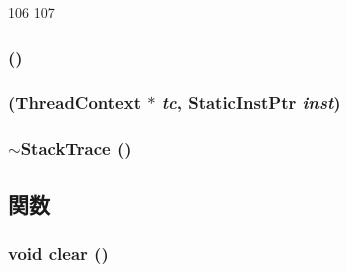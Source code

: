 \begin{DoxyCode}
106 {
107 }
\end{DoxyCode}
\hypertarget{classMipsISA_1_1StackTrace_a5a9b2e3bba2262e73b20f87325efd063}{
\subsubsection[{StackTrace}]{ ()}}
\label{classMipsISA_1_1StackTrace_a5a9b2e3bba2262e73b20f87325efd063}
\hypertarget{classMipsISA_1_1StackTrace_a7c751415d8c87372fc7d24513309cf1b}{
\subsubsection[{StackTrace}]{ ({\bf ThreadContext} $\ast$ {\em tc}, \/  {\bf StaticInstPtr} {\em inst})}}
\label{classMipsISA_1_1StackTrace_a7c751415d8c87372fc7d24513309cf1b}
\hypertarget{classMipsISA_1_1StackTrace_adec953886bb73db4f2ec91ed12810135}{
\subsubsection[{$\sim$StackTrace}]{\setlength{\rightskip}{0pt plus 5cm}$\sim${\bf StackTrace} ()}}
\label{classMipsISA_1_1StackTrace_adec953886bb73db4f2ec91ed12810135}


\subsection{関数}
\hypertarget{classMipsISA_1_1StackTrace_ac8bb3912a3ce86b15842e79d0b421204}{
\subsubsection[{clear}]{\setlength{\rightskip}{0pt plus 5cm}void clear ()}}
\label{classMipsISA_1_1StackTrace_ac8bb3912a3ce86b15842e79d0b421204}



